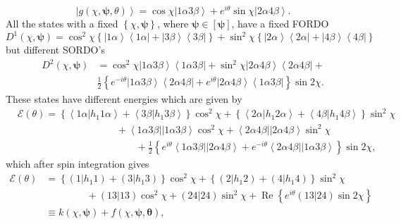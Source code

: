\documentclass[aps,preprint]{revtex4}%
\begin{document}
\begin{equation}
\left\vert g\left(  \chi\bm{,\psi,}\theta\right)  \right\rangle =\cos
\chi\left\vert 1\alpha3\beta\right\rangle +e^{i\theta}\sin\chi\left\vert
2\alpha4\beta\right\rangle .
\end{equation}
All the states with a fixed $\left\{  \chi\bm{,\psi}\right\}  $, where
$\bm{\psi\in}\left[  \bm{\psi}\right]  $, have a fixed FORDO
\[
D^{1}\left(  \chi,\bm{\psi}\right)  =\cos^{2}\chi\left\{  \left\vert
1\alpha\right\rangle \left\langle 1\alpha\right\vert +\left\vert
3\beta\right\rangle \left\langle 3\beta\right\vert \right\}  +\sin^{2}%
\chi\left\{  \left\vert 2\alpha\right\rangle \left\langle 2\alpha\right\vert
+\left\vert 4\beta\right\rangle \left\langle 4\beta\right\vert \right\}
\]
but different SORDO's%
\begin{align}
D^{2}\left(  \chi,\bm{\psi}\right)   &  =\cos^{2}\chi\left\vert 1\alpha
3\beta\right\rangle \left\langle 1\alpha3\beta\right\vert +\sin^{2}%
\chi\left\vert 2\alpha4\beta\right\rangle \left\langle 2\alpha4\beta
\right\vert +\nonumber\\
&  \frac{1}{2}\left\{  e^{-i\theta}\left\vert 1\alpha3\beta\right\rangle
\left\langle 2\alpha4\beta\right\vert +e^{i\theta}\left\vert 2\alpha
4\beta\right\rangle \left\langle 1\alpha3\beta\right\vert \right\}  \sin2\chi.
\end{align}
These states have different energies which are given by%
\begin{align}
&  \mathcal{E}\left(  \theta\right)  =\left\{  \left\langle 1\alpha\left\vert
h_{1}1\alpha\right.  \right\rangle +\left\langle 3\beta\left\vert h_{1}%
3\beta\right.  \right\rangle \right\}  \cos^{2}\chi+\left\{  \left\langle
2\alpha\left\vert h_{1}2\alpha\right.  \right\rangle +\left\langle
4\beta\left\vert h_{1}4\beta\right.  \right\rangle \right\}  \sin^{2}%
\chi\nonumber\\
&  \qquad\qquad\qquad\qquad\qquad+\left\langle 1\alpha3\beta\right\vert
\left\vert 1\alpha3\beta\right\rangle \cos^{2}\chi+\left\langle 2\alpha
4\beta\right\vert \left\vert 2\alpha4\beta\right\rangle \sin^{2}%
\chi\nonumber\\
&  \qquad\qquad\qquad\qquad\qquad\qquad+\frac{1}{2}\left\{  e^{i\theta
}\left\langle 1\alpha3\beta\right\vert \left\vert 2\alpha4\beta\right\rangle
+e^{-i\theta}\left\langle 2\alpha4\beta\right\vert \left\vert 1\alpha
3\beta\right\rangle \right\}  \sin2\chi,
\end{align}
which after spin integration gives
\begin{align}
\mathcal{E}\left(  \theta\right)   &  =\left\{  \left(  1\left\vert
h_{1}1\right.  \right)  +\left(  3\left\vert h_{1}3\right.  \right)  \right\}
\cos^{2}\chi+\left\{  \left(  2\left\vert h_{1}2\right.  \right)  +\left(
4\left\vert h_{1}4\right.  \right)  \right\}  \sin^{2}\chi\nonumber\\
&  \qquad\qquad\,+\left(  \left.  13\right\vert 13\right)  \cos^{2}%
\chi+\left(  \left.  24\right\vert 24\right)  \sin^{2}\chi+\operatorname{Re}%
\left\{  e^{i\theta}\left(  \left.  13\right\vert 24\right)  \sin2\chi\right\}
\nonumber\\
&  \equiv k\left(  \chi,\bm{\psi}\right)  +f\left(  \chi
,\bm{\psi ,\theta}\right)  ,
\end{align}
\end{document}
